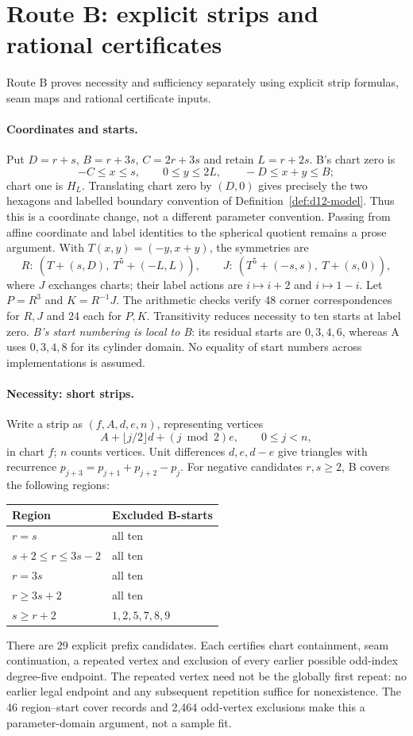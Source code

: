 \documentclass[11pt]{amsart}
\theoremstyle{definition}\newtheorem{definition}[theorem]{Definition}
\begin{document}
\section{Route B: explicit strips and rational certificates}\label{sec:route_b}
Route B \cite{ProofB} proves necessity and sufficiency separately using explicit
strip formulas, seam maps and rational certificate inputs.

\paragraph{Coordinates and starts.}
Put $D=r+s$, $B=r+3s$, $C=2r+3s$ and retain $L=r+2s$.
B's chart zero is
\[
 -C\le x\le s,\qquad 0\le y\le2L,\qquad -D\le x+y\le B;
\]
chart one is $H_L$. Translating chart zero by $(D,0)$ gives precisely
the two hexagons and labelled boundary convention of
Definition~\ref{def:d12-model}. Thus this is a coordinate change, not a
different parameter convention. Passing from affine coordinate and
label identities to the spherical quotient remains a prose argument.
With $T(x,y)=(-y,x+y)$, the symmetries are
\[
 R:\ (T+(s,D),\ T^5+(-L,L)),\qquad
 J:\ (T^5+(-s,s),\ T+(s,0)),
\]
where $J$ exchanges charts; their label actions are $i\mapsto i+2$
and $i\mapsto1-i$. Let $P=R^3$ and $K=R^{-1}J$.
The arithmetic checks verify 48 corner correspondences for $R,J$ and
24 each for $P,K$. Transitivity reduces necessity to ten starts at
label zero. \emph{B's start numbering is local to B}: its residual
starts are $0,3,4,6$, whereas A uses $0,3,4,8$ for its cylinder domain.
No equality of start numbers across implementations is assumed.

\paragraph{Necessity: short strips.}\label{prop:route_b-necessity}
Write a strip as $(f,A,d,e,n)$, representing vertices
\[
 A+\lfloor j/2\rfloor d+(j\bmod2)e,\qquad 0\le j<n,
\]
in chart $f$; $n$ counts vertices. Unit differences $d,e,d-e$ give
triangles with recurrence $p_{j+3}=p_{j+1}+p_{j+2}-p_j$.
For negative candidates $r,s\ge2$, B covers the following regions:
\begin{center}\small
\begin{tabular}{ll}\toprule
Region & Excluded B-starts\\\midrule
$r=s$ & all ten\\
$s+2\le r\le3s-2$ & all ten\\
$r=3s$ & all ten\\
$r\ge3s+2$ & all ten\\
$s\ge r+2$ & $1,2,5,7,8,9$\\\bottomrule
\end{tabular}
\end{center}
There are 29 explicit prefix candidates. Each certifies chart
containment, seam continuation, a repeated vertex and exclusion of
every earlier possible odd-index degree-five endpoint. The repeated
vertex need not be the globally first repeat: no earlier legal endpoint
and any subsequent repetition suffice for nonexistence. The 46
region--start cover records and 2,464 odd-vertex exclusions make this
a parameter-domain argument, not a sample fit.
\end{document}

